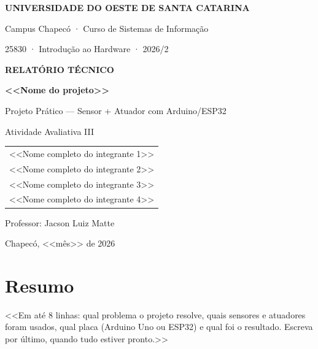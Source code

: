 \documentclass{abntex2}
\begin{document}
\begin{titlepage}
  \centering
  {\large\bfseries\color{unoescazul} UNIVERSIDADE DO OESTE DE SANTA CATARINA\par}
  {\normalsize Campus Chapecó · Curso de Sistemas de Informação\par}
  {\normalsize 25830 · Introdução ao Hardware · 2026/2\par}
  \vspace{3cm}

  {\Large\bfseries\color{unoescazul} RELATÓRIO TÉCNICO\par}
  \vspace{0.6cm}
  {\LARGE\bfseries <<Nome do projeto>>\par}
  \vspace{0.4cm}
  {\large Projeto Prático — Sensor + Atuador com Arduino/ESP32\par}
  \vspace{0.3cm}
  {\normalsize Atividade Avaliativa III\par}
  \vspace{3cm}

  \begin{tabular}{l}
    <<Nome completo do integrante 1>> \\
    <<Nome completo do integrante 2>> \\
    <<Nome completo do integrante 3>> \\
    <<Nome completo do integrante 4>> \\
  \end{tabular}
  \vspace{2cm}

  {\normalsize Professor: Jacson Luiz Matte\par}
  \vfill
  {\normalsize Chapecó, <<mês>> de 2026\par}
\end{titlepage}

\section*{Resumo}
<<Em até 8 linhas: qual problema o projeto resolve, quais sensores e atuadores foram usados,
qual placa (Arduino Uno ou ESP32) e qual foi o resultado. Escreva por último, quando tudo
estiver pronto.>>
\end{document}
